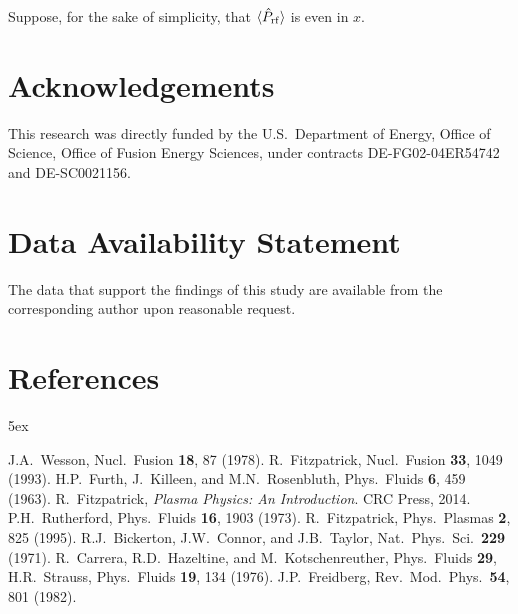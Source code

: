 \documentclass[12pt,prb,aps]{revtex4-1}
\begin{document}
Suppose, for the sake of simplicity, that $\langle \hat{P}_{\rm rf}\rangle$ is even in $x$. 


\section*{Acknowledgements}
This research was directly funded by the U.S.\ Department of Energy, Office of Science, Office of Fusion Energy Sciences,  under  contracts DE-FG02-04ER54742 and DE-SC0021156. 

\section*{Data Availability Statement}
The data that support the findings of this study are available from the corresponding author upon reasonable request.

\section*{References}
\begin{thebibliography}{99}\baselineskip 5ex

 J.A.~Wesson, Nucl.\ Fusion {\bf 18}, 87 (1978).
 R.~Fitzpatrick, Nucl.\ Fusion {\bf 33}, 1049 (1993). 
 H.P.~Furth, J.~Killeen, and M.N.~Rosenbluth, Phys.\ Fluids {\bf 6}, 459 (1963).
 R.~Fitzpatrick, {\em Plasma Physics: An Introduction}. CRC Press, 2014. 
 P.H.~Rutherford,  Phys.\ Fluids {\bf 16}, 1903 (1973).
 R.~Fitzpatrick, Phys.\ Plasmas {\bf 2}, 825 (1995).
 R.J.~Bickerton, J.W.~Connor, and J.B.~Taylor, Nat.\ Phys.\ Sci.\ {\bf 229} (1971).
 R.~Carrera, R.D.~Hazeltine, and M.~Kotschenreuther, Phys.\ Fluids {\bf 29},
 H.R.~Strauss, Phys.\  Fluids {\bf 19}, 134 (1976). 
 J.P.~Freidberg, Rev.\ Mod.\ Phys.\ {\bf 54}, 801 (1982). 

\end{thebibliography}

\end{document}
